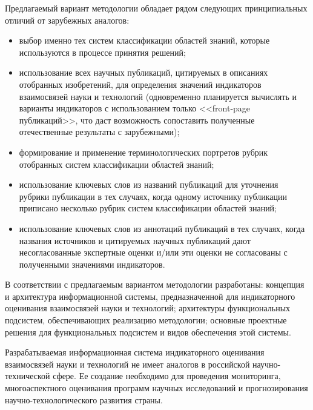 \begin{multicols}{2}
  Предлагаемый вариант методологии обладает рядом следующих принципиальных отличий 
от зарубежных аналогов:
  \begin{itemize}
\item выбор именно тех систем классификации областей знаний, которые используются в 
процессе принятия решений;
\item использование всех научных публикаций, цитируемых в описаниях отобранных 
изобретений, для определения значений индикаторов взаимосвязей науки и технологий 
(одновременно планируется вычислять и варианты индикаторов с использованием только 
<<front-page пуб\-ли\-ка\-ций>>, что даст возможность сопоставить полученные 
отечественные результаты с зарубежными);
\item формирование и применение терминологических портретов рубрик отобранных 
систем классификации областей знаний;
\item использование ключевых слов из названий пуб\-ли\-ка\-ций для уточнения рубрики 
публикации в тех случаях, когда одному источнику публикации приписано несколько 
рубрик систем классификации областей знаний;
\item использование ключевых слов из аннотаций пуб\-ли\-ка\-ций в тех случаях, когда 
названия источников и цитируемых научных публикаций дают несогласованные 
экспертные оценки и/или эти оценки не согласованы с полученными значениями 
индикаторов.
\end{itemize}

  В соответствии с предлагаемым вариантом методологии разработаны: концепция и 
архитектура информационной системы, предназначенной для индикаторного оценивания 
взаимосвязей науки и технологий; архитектуры функциональных подсистем, обеспечивающих 
реализацию методологии; основные проектные решения для функциональных подсистем и 
видов обеспечения этой системы.
  
  Разрабатываемая информационная система индикаторного оценивания взаимосвязей науки и 
технологий не имеет аналогов в российской на\-уч\-но-тех\-ни\-че\-ской сфере. Ее создание 
необходимо для проведения мониторинга, многоаспектного оценивания программ научных 
исследований и прогнозирования научно-технологического развития \mbox{страны}.

{\small\frenchspacing
{%
\begin{thebibliography}{99}


\end{thebibliography}}}
\end{multicols}
